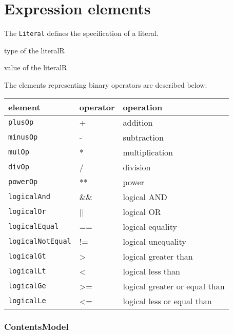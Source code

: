 \section{Expression elements}


The {\tt Literal} defines the specification of a literal.

\begin{HIRChildElements}
	{type of the literal}{R}
\end{HIRChildElements}

\begin{HIRAttributes}
	{value of the literal}{R}
\end{HIRAttributes}


The elements representing binary operators are described below: 

\begin{tabular}{|l|p{4cm}|l|}
	\hline
	 element & operator & operation \\ \hline\hline
	 {\tt plusOp} & + & addition \\ \hline 
	 {\tt minusOp} & - & subtraction \\ \hline 
	 {\tt mulOp} & * & multiplication \\ \hline 
	 {\tt divOp} & / & division \\ \hline 
	 {\tt powerOp} & ** & power \\ \hline 
	 {\tt logicalAnd} & \&\& & logical AND \\ \hline 
	 {\tt logicalOr} & || & logical OR \\ \hline 
	 {\tt logicalEqual} & == & logical equality \\ \hline 
	 {\tt logicalNotEqual} & != & logical unequality \\ \hline 
	 {\tt logicalGt} & > & logical greater than \\ \hline 
	 {\tt logicalLt} & < & logical less than \\ \hline 
	 {\tt logicalGe} & >= & logical greater or equal than \\ \hline 
	 {\tt logicalLe} & <= & logical less or equal than \\ \hline 
\end{tabular}

\subsubsection*{ContentsModel}{}

